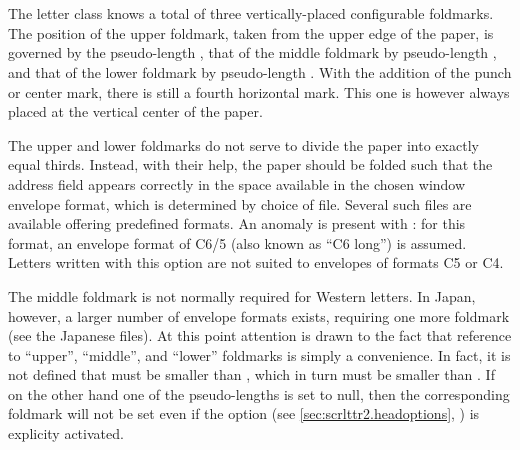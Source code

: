 \begin{Declaration}
  \\
  \\
\end{Declaration}
%
%
%
The letter class  knows a total of three
vertically-placed configurable foldmarks. The position of the upper
foldmark, taken from the upper edge of the paper, is governed by the
pseudo-length , that of the middle foldmark by
pseudo-length
, and that
of the lower foldmark by pseudo-length . With
the addition of the punch or 
center%
mark, there is still a fourth horizontal mark. This one is however
always placed at the vertical center of the paper.

The upper and lower foldmarks do not serve to divide the paper into
exactly equal thirds. Instead, with their help, the paper should be
folded such that the address field appears correctly in the space
available in the chosen window envelope format, which is determined by
choice of  file. Several such files are available offering
predefined formats. An anomaly is present with : for
this format, an envelope format of C6/5 (also known as ``C6 long'') is
assumed. Letters written with this option are not suited to envelopes
of formats C5 or C4.

The middle foldmark is not normally required for Western letters. In
Japan, however, a larger number of envelope formats exists, requiring
one more foldmark (see the Japanese  files). At this point
attention is drawn to the fact that reference to ``upper'',
``middle'', and ``lower'' foldmarks is simply a convenience. In fact,
it is not defined that  must be smaller than
, which in turn must be smaller than
. If on the other hand one of the
pseudo-lengths is set to null, then the corresponding foldmark will
not be set even if the option  (see
\autoref{sec:scrlttr2.headoptions},
) is explicity activated.
%
%
%
%


